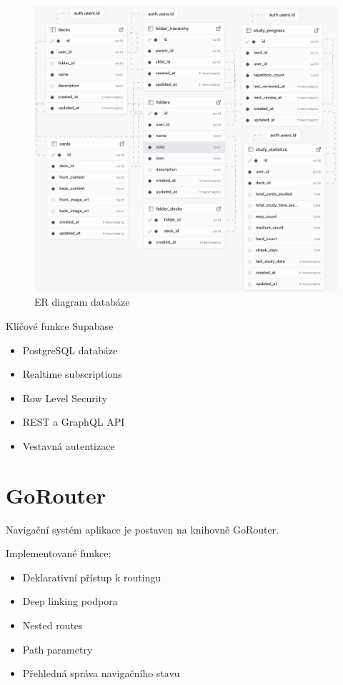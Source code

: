 \documentclass[12pt, a4paper, oneside]{report}
\begin{document}
	\begin{figure}[h]
		\centering
		\includegraphics[width=\linewidth]{../image/diagram-databaze.png}
		\caption{ER diagram databáze}
		\label{fig:database}
	\end{figure}

	Klíčové funkce Supabase
	\begin{itemize}
		\item PostgreSQL databáze
		\item Realtime subscriptions
		\item Row Level Security
		\item REST a GraphQL API
		\item Vestavná autentizace
	\end{itemize}

	\section{GoRouter}
	Navigační systém aplikace je postaven na knihovně GoRouter.

	Implementované funkce:
	\begin{itemize}
		\item Deklarativní přístup k routingu
		\item Deep linking podpora
		\item Nested routes
		\item Path parametry
		\item Přehledná správa navigačního stavu
	\end{itemize}
\end{document}
